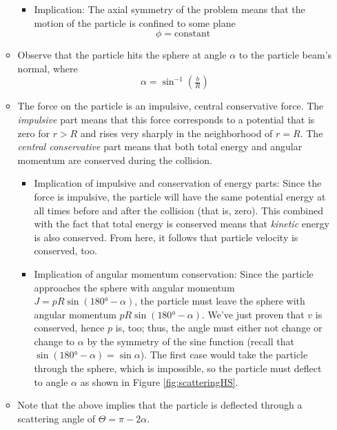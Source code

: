 \documentclass[../notes.tex]{subfiles}
\begin{document}
\begin{itemize}
\begin{itemize}
        \begin{itemize}
            \item Implication: The axial symmetry of the problem means that the motion of the particle is confined to some plane
            \begin{equation*}
                \phi = \text{constant}
            \end{equation*}
        \end{itemize}
        \item Observe that the particle hits the sphere at angle $\alpha$ to the particle beam's normal, where
        \begin{equation*}
            \alpha = \sin^{-1}\left( \tfrac{b}{R} \right)
        \end{equation*}
        \item The force on the particle is an impulsive, central conservative force. The \emph{impulsive} part means that this force corresponds to a potential that is zero for $r>R$ and rises very sharply in the neighborhood of $r=R$. The \emph{central conservative} part means that both total energy and angular momentum are conserved during the collision.
        \begin{itemize}
            \item Implication of impulsive and conservation of energy parts: Since the force is impulsive, the particle will have the same potential energy at all times before and after the collision (that is, zero). This combined with the fact that total energy is conserved means that \emph{kinetic} energy is also conserved. From here, it follows that particle velocity is conserved, too.
            \item Implication of angular momentum conservation: Since the particle approaches the sphere with angular momentum $J=pR\sin(\ang{180}-\alpha)$, the particle must leave the sphere with angular momentum $pR\sin(\ang{180}-\alpha)$. We've just proven that $v$ is conserved, hence $p$ is, too; thus, the angle must either not change or change to $\alpha$ by the symmetry of the sine function (recall that $\sin(\ang{180}-\alpha)=\sin\alpha$). The first case would take the particle through the sphere, which is impossible, so the particle must deflect to angle $\alpha$ as shown in Figure \ref{fig:scatteringHS}.
        \end{itemize}
        \item Note that the above implies that the particle is deflected through a scattering angle of $\Theta=\pi-2\alpha$.
        \begin{itemize}

\end{itemize}
\end{itemize}
\end{itemize}
\end{document}
